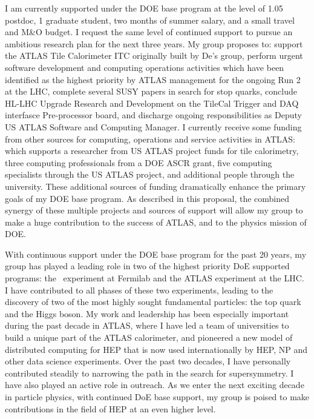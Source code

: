 
I am currently supported under the DOE base program at the level of 1.05 postdoc, 1 graduate student, two months of summer salary, and a small travel and M\&O budget. I request the same level of continued support to pursue an ambitious research plan for the next three years. My group proposes to: support the ATLAS Tile Calorimeter ITC originally built by De's group, perform urgent software development and computing operations activities which have been identified as the highest priority by ATLAS management for the ongoing Run 2 at the LHC, complete several SUSY papers in search for stop quarks, conclude HL-LHC Upgrade Research and Development on the TileCal Trigger and DAQ interfasce Pre-processor board, and discharge ongoing responsibilities as Deputy US ATLAS Software and Computing Manager. I currently receive some funding from other sources for computing, operations and service activities in ATLAS: which supports a researcher from US ATLAS project funds for tile calorimetry, three computing professionals from a DOE ASCR grant, five computing specialists through the US ATLAS project, and additional people through the university. These additional sources of funding dramatically enhance the primary goals of my DOE base program. As described in this proposal, the combined synergy of these multiple projects and sources of support will allow my group to make a huge contribution to the success of ATLAS, and to the physics mission of DOE.

With continuous support under the DOE base program for the past 20 years, my group has played a leading role in two of the highest priority DoE supported programs: the \ experiment at Fermilab and the ATLAS experiment at the LHC. I have contributed to all phases of these two experiments, leading to the discovery of two of the most highly sought fundamental particles: the top quark and the Higgs boson. My work and leadership has been especially important during the past decade in ATLAS, where I have led a team of universities to build a unique part of the ATLAS calorimeter, and pioneered a new model of distributed computing for HEP that is now used internationally by HEP, NP and other data science experiments. Over the past two decades, I have personally contributed steadily to narrowing the path in the search for supersymmetry. I have also played an active role in outreach. As we enter the next exciting decade in particle physics, with continued DoE base support, my group is poised to make contributions in the field of HEP at an even higher level.

